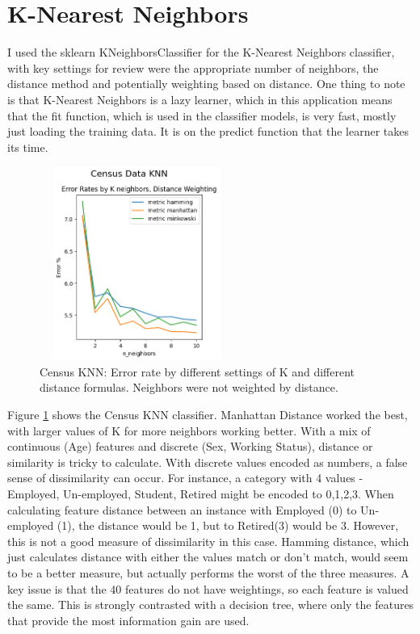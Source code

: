 \documentclass[letterpaper]{article} %
\begin{document}
\section{K-Nearest Neighbors}
I used the sklearn KNeighborsClassifier for the K-Nearest Neighbors classifier, with key settings for review were the appropriate number of neighbors, the distance method and potentially weighting based on distance.  One thing to note is that K-Nearest Neighbors is a lazy learner, which in this application means that the fit function, which is used in the classifier models, is very fast, mostly just loading the training data.  It is on the predict function that the learner takes its time.

\begin{figure}[h]
\centering
\includegraphics[width=2.5in, height=2.5in]{figures/Census_Data_KNN_knn_1.png}
\caption{Census KNN:  Error rate by different settings of K and different distance formulas.  Neighbors were not weighted by distance.  }
\label{fig:census_knn_1}
\end{figure}

Figure \ref{fig:census_knn_1} shows the Census KNN classifier.  Manhattan Distance worked the best, with larger values of K for more neighbors working better.  With a mix of continuous (Age) features and discrete (Sex, Working Status), distance or similarity is tricky to calculate.  With discrete values encoded as numbers, a false sense of dissimilarity can occur.  For instance, a category with 4 values - Employed, Un-employed, Student, Retired might be encoded to 0,1,2,3.  When calculating feature distance between an instance with Employed (0) to Un-employed (1), the distance would be 1, but to Retired(3) would be 3.  However, this is not a good measure of dissimilarity in this case.  Hamming distance, which just calculates distance with either the values match or don't match, would seem to be a better measure, but actually performs the worst of the three measures.  A key issue is that the 40 features do not have weightings, so each feature is valued the same.  This is strongly contrasted with a decision tree, where only the features that provide the most information gain are used.
\end{document}
